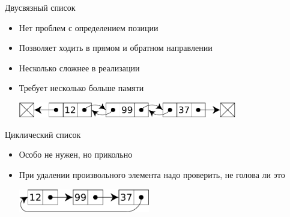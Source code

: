 \documentclass[aspectratio=169]{beamer}
\begin{document}
\begin{frame}{Двусвязный список}
    \begin{itemize}
        \item Нет проблем с определением позиции
        \item Позволяет ходить в прямом и обратном направлении
        \item Несколько сложнее в реализации
        \item Требует несколько больше памяти
              \begin{center}
                  \includegraphics[width=0.75\textwidth]{double-linked-list.pdf}

                  \begin{tiny}
                  \end{tiny}
              \end{center}
    \end{itemize}
\end{frame}

\begin{frame}{Циклический список}
    \begin{itemize}
        \item Особо не нужен, но прикольно
        \item При удалении произвольного элемента надо проверить, не голова ли это
              \begin{center}
                  \includegraphics[width=0.45\textwidth]{cyclic-list.pdf}

                  \begin{tiny}
                  \end{tiny}
              \end{center}
    \end{itemize}
\end{frame}
\end{document}
